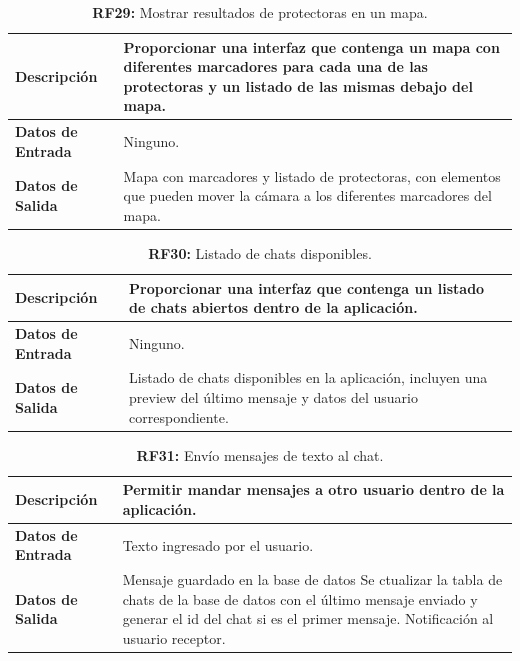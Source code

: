 \documentclass[a4paper, 12pt]{article}
\begin{document}
\begin{table}[H]
\captionsetup{list=no}%
\captionsetup{justification=raggedright,singlelinecheck=false}
\captionsetup{labelformat=empty}
\caption{\textbf{RF29:} Mostrar resultados de protectoras en un mapa.}
\label{tab:RF29}
	\begin{tabular}{|m{5cm}|m{10cm}|}
	\hline
	\textbf{Descripción} & Proporcionar una interfaz que contenga un mapa con diferentes marcadores para cada una de las protectoras y un listado de las mismas debajo del mapa. \\ 
	\hline
	\textbf{Datos de Entrada} & Ninguno. \\ 
	\hline
	\textbf{Datos de Salida} & Mapa con marcadores y listado de protectoras, con elementos que pueden mover la cámara a los diferentes marcadores del mapa. \\ 
	\hline
\end{tabular}
\end{table}


\begin{table}[H]
\captionsetup{list=no}%
\captionsetup{justification=raggedright,singlelinecheck=false}
\captionsetup{labelformat=empty}
\caption{\textbf{RF30:} Listado de chats disponibles.}
\label{tab:RF30}
	\begin{tabular}{|m{5cm}|m{10cm}|}
	\hline
	\textbf{Descripción} & Proporcionar una interfaz que contenga un listado de chats abiertos dentro de la aplicación. \\ 
	\hline
	\textbf{Datos de Entrada} & Ninguno. \\ 
	\hline
	\textbf{Datos de Salida} & Listado de chats disponibles en la aplicación, incluyen una preview del último mensaje y datos del usuario correspondiente. \\ 
	\hline
\end{tabular}
\end{table}


\begin{table}[H]
\captionsetup{list=no}%
\captionsetup{justification=raggedright,singlelinecheck=false}
\captionsetup{labelformat=empty}
\caption{\textbf{RF31:} Envío mensajes de texto al chat.}
\label{tab:RF31}
	\begin{tabular}{|m{5cm}|m{10cm}|}
	\hline
	\textbf{Descripción} & Permitir mandar mensajes a otro usuario dentro de la aplicación. \\ 
	\hline
	\textbf{Datos de Entrada} & Texto ingresado por el usuario. \\ 
	\hline
	\textbf{Datos de Salida} & Mensaje guardado en la base de datos Se ctualizar la tabla de chats de la base de datos con el último mensaje enviado y generar el id del chat si es el primer mensaje. Notificación al usuario receptor. \\ 
	\hline
\end{tabular}
\end{table}
\end{document}
